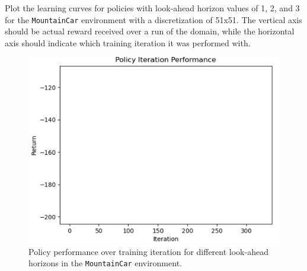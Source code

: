 \documentclass{article}
\begin{document}
\begin{enumerate}[(a)]
Plot the learning curves for policies with look-ahead horizon values of 1, 2, and 3 for the \texttt{MountainCar} environment with a discretization of 51x51. The vertical axis should be actual reward received over a run of the domain, while the horizontal axis should indicate which training iteration it was performed with.

\end{enumerate}

\begin{figure}[h!]
    \centering
        \includegraphics[width=\textwidth]{../figures/lookahead_mc.png}
        \caption{Policy performance over training iteration for different look-ahead horizons in the \texttt{MountainCar} environment.}
\end{figure}
\end{document}
